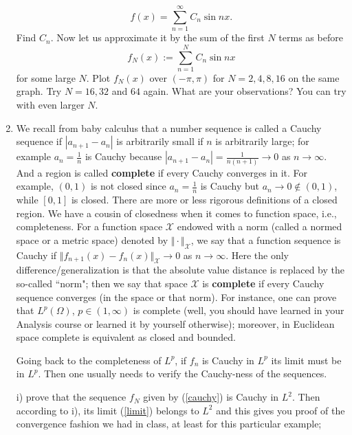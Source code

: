 \documentclass[6pt]{article}
\numberwithin{equation}{section}
\begin{document}
\begin{enumerate}
\begin{equation}\label{cauchy}
      f(x)=\sum_{n=1}^\infty C_n\sin nx.
\end{equation}
    Find $C_n$.  Now let us approximate it by the sum of the first $N$ terms as before
\begin{equation}\label{limit}
     f_N(x):=\sum_{n=1}^N C_n\sin nx
\end{equation}
for some large $N$.  Plot $f_N(x)$ over $(-\pi,\pi)$ for $N=2,4,8,16$ on the same graph.  Try $N=16,32$ and $64$ again.  What are your observations?  You can try with even larger $N$.

\item We recall from baby calculus that a number sequence is called a Cauchy sequence if $|a_{n+1}-a_n|$ is arbitrarily small if $n$ is arbitrarily large; for example $a_n=\frac{1}{n}$ is Cauchy because $|a_{n+1}-a_{n}|=\frac{1}{n(n+1)}\rightarrow 0$ as $n\rightarrow \infty$.  And a region is called \textbf{complete} if every Cauchy converges in it.  For example, $(0,1)$ is not closed since $a_n=\frac{1}{n}$ is Cauchy but $a_n\rightarrow 0\not\in (0,1)$, while $[0,1]$ is closed.  There are more or less rigorous definitions of a closed region.  We have a cousin of closedness when it comes to function space, i.e., completeness.  For a function space $\mathcal X$ endowed with a norm (called a normed space or a metric space) denoted by $\Vert \cdot \Vert_{\mathcal X}$, we say that a function sequence is Cauchy if $\Vert f_{n+1}(x)-f_n(x) \Vert_{\mathcal X}\rightarrow 0$ as $n\rightarrow \infty$.  Here the only difference/generalization is that the absolute value distance is replaced by the so-called ``norm"; then we say that space $\mathcal X$ is \textbf{complete} if every Cauchy sequence converges (in the space or that norm).  For instance, one can prove that $L^p(\Omega)$, $p\in(1,\infty)$ is complete (well, you should have learned in your Analysis course or learned it by yourself otherwise); moreover, in Euclidean space complete is equivalent as closed and bounded.

Going back to the completeness of $L^p$, if $f_n$ is Cauchy in $L^p$ its limit must be in $L^p$.  Then one usually needs to verify the Cauchy-ness of the sequences.

i) prove that the sequence $f_N$ given by (\ref{cauchy}) is Cauchy in $L^2$.  Then according to i), its limit (\ref{limit}) belongs to $L^2$ and this gives you proof of the convergence fashion we had in class, at least for this particular example;


\end{enumerate}
\end{document}
